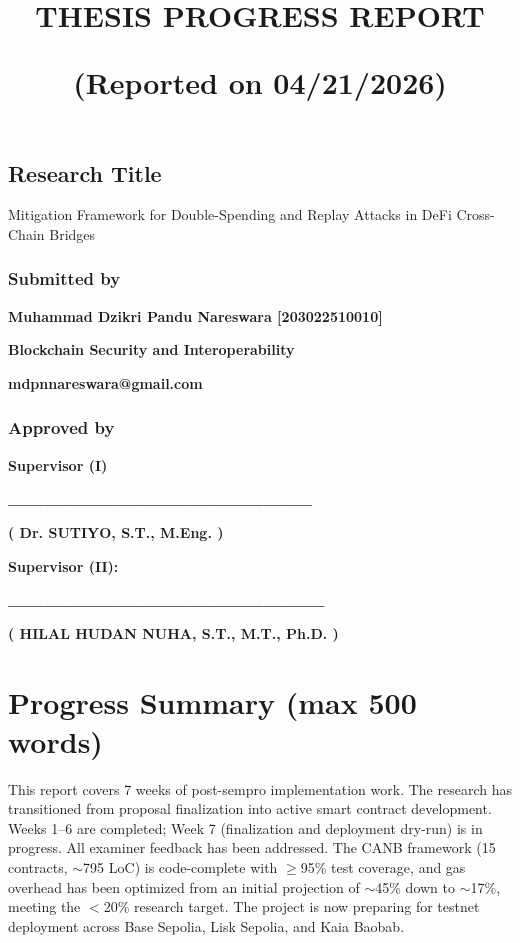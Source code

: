 \documentclass[
]{article}
\title{THESIS PROGRESS REPORT

(Reported on 04/21/2026)}
\author{}
\date{}
\begin{document}
\maketitle

\hypertarget{research-title}{%
\subsection{Research Title}\label{research-title}}

Mitigation Framework for Double-Spending and Replay Attacks in DeFi Cross-Chain Bridges

\hypertarget{submitted-by}{%
\subsubsection{Submitted by}\label{submitted-by}}

\textbf{Muhammad Dzikri Pandu Nareswara {[}203022510010{]}}

\textbf{Blockchain Security and Interoperability}

\textbf{mdpnnareswara@gmail.com}

\hypertarget{approved-by}{%
\subsubsection{Approved by}\label{approved-by}}

\textbf{Supervisor (I)}

\textbf{\_\_\_\_\_\_\_\_\_\_\_\_\_\_\_\_\_\_\_\_\_\_\_\_\_}

\textbf{( Dr. SUTIYO, S.T., M.Eng. )}

\textbf{Supervisor (II):}

\textbf{\_\_\_\_\_\_\_\_\_\_\_\_\_\_\_\_\_\_\_\_\_\_\_\_\_\_}

\textbf{( HILAL HUDAN NUHA, S.T., M.T., Ph.D. )}



\newpage
\hypertarget{progress-summary}{%
\section{Progress Summary (max 500 words)}\label{progress-summary}}

This report covers 7 weeks of post-sempro implementation work. The research has transitioned from proposal finalization into active smart contract development. Weeks 1--6 are completed; Week 7 (finalization and deployment dry-run) is in progress. All examiner feedback has been addressed. The CANB framework (15 contracts, $\sim$795 LoC) is code-complete with $\geq$95\% test coverage, and gas overhead has been optimized from an initial projection of $\sim$45\% down to $\sim$17\%, meeting the $<$20\% research target. The project is now preparing for testnet deployment across Base Sepolia, Lisk Sepolia, and Kaia Baobab.
\end{document}
